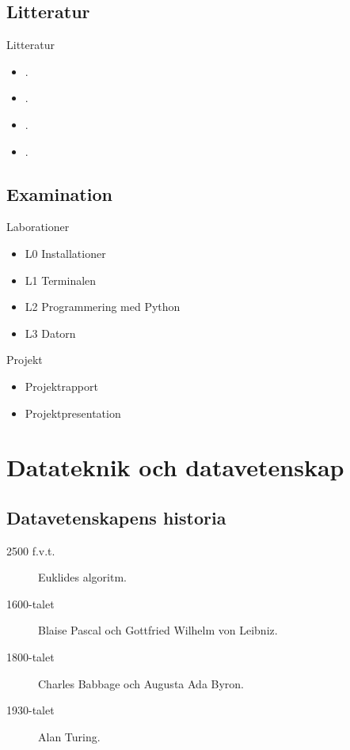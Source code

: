 \documentclass{beamer}
\begin{document}
\subsection{Litteratur}
\begin{frame}{Litteratur}
  \begin{itemize}
    \item {} \cite{Brookshear2012csa}.
    \item {} \cite{nemeth2011ual}.
    \item {} \cite{pythonkramaren1}.
    \item {} \cite{Oetiker2011lshort}.
  \end{itemize}
\end{frame}

\subsection{Examination}
\begin{frame}{Laborationer}
  \begin{itemize}
    \item L0 Installationer
    \item L1 Terminalen
    \item L2 Programmering med Python
    \item L3 Datorn
  \end{itemize}
\end{frame}
\begin{frame}{Projekt}
  \begin{itemize}
    \item Projektrapport
    \item Projektpresentation
  \end{itemize}
\end{frame}


\section{Datateknik och datavetenskap}

\subsection{Datavetenskapens historia}
\begin{frame}{\insertsubsectionhead}
  \begin{description}
    \item[2500 f.v.t.] Euklides algoritm.
    \item[1600-talet] Blaise Pascal och Gottfried Wilhelm von Leibniz.
    \item[1800-talet] Charles Babbage och Augusta Ada Byron.
    \item[1930-talet] Alan Turing.
  \end{description}
\end{frame}
\end{document}
